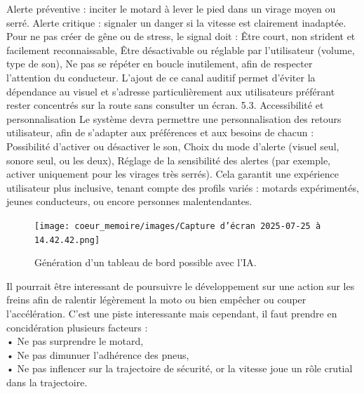 Alerte préventive : inciter le motard à lever le pied dans un virage moyen ou serré.
Alerte critique : signaler un danger si la vitesse est clairement inadaptée.
Pour ne pas créer de gêne ou de stress, le signal doit :
Être court, non strident et facilement reconnaissable,
Être désactivable ou réglable par l’utilisateur (volume, type de son),
Ne pas se répéter en boucle inutilement, afin de respecter l’attention du conducteur.
L’ajout de ce canal auditif permet d’éviter la dépendance au visuel et s’adresse particulièrement aux utilisateurs préférant rester concentrés sur la route sans consulter un écran.
5.3. Accessibilité et personnalisation
Le système devra permettre une personnalisation des retours utilisateur, afin de s’adapter aux préférences et aux besoins de chacun :
Possibilité d’activer ou désactiver le son,
Choix du mode d’alerte (visuel seul, sonore seul, ou les deux),
Réglage de la sensibilité des alertes (par exemple, activer uniquement pour les virages très serrés).
Cela garantit une expérience utilisateur plus inclusive, tenant compte des profils variés : motards expérimentés, jeunes conducteurs, ou encore personnes malentendantes.

\begin{figure}[H]
    \centering
    \texttt{[image: coeur\_memoire/images/Capture d’écran 2025-07-25 à 14.42.42.png]} 
    \caption{Génération d'un tableau de bord possible avec l'IA.}
\end{figure}

Il pourrait être interessant de poursuivre le développement sur une action sur les freins afin de ralentir légèrement la moto ou bien empêcher ou couper l'accélération. C'est une piste interessante mais cependant, il faut prendre en concidération plusieurs facteurs : \\
• Ne pas surprendre le motard,\\
• Ne pas dimunuer l'adhérence des pneus,\\
• Ne pas inflencer sur la trajectoire de sécurité, or la vitesse joue un rôle crutial dans la trajectoire.
